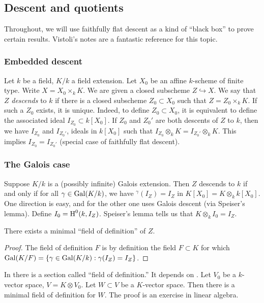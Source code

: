 \subsection{Descent and quotients}

Throughout, we will use faithfully flat descent as a kind of ``black box'' to 
prove certain results. Vistoli's notes \cite{v05} are a fantastic reference for 
this topic. 


\subsubsection{Embedded descent}

Let $k$ be a field, $K/k$ a field extension. Let $X_0$ be an affine $k$-scheme 
of finite type. Write $X=X_0\times_k K$. We are given a closed subscheme 
$Z\hookrightarrow X$. We say that $Z$ \emph{descends} to $k$ if there is a closed 
subscheme $Z_0\subset X_0$ such that $Z=Z_0\times_k K$. If such a $Z_0$ exists, 
it is unique. Indeed, to define $Z_0\subset X_0$, it is equivalent to 
define the associated ideal $I_{Z_0}\subset k[X_0]$. If $Z_0$ and $Z_0'$ are 
both descents of $Z$ to $k$, then we have $I_{Z_0}$ and $I_{Z_0'}$, ideals 
in $k[X_0]$ such that $I_{Z_0}\otimes_k K=I_{Z_0'}\otimes_k K$. This implies 
$I_{Z_0} = I_{Z_0'}$ (special case of faithfully flat descent). 


\subsubsection{The Galois case}

Suppose $K/k$ is a (possibly infinite) Galois extension. Then $Z$ descends to 
$k$ if and only if for all $\gamma\in \operatorname{Gal}(K/k)$, we have 
$^\gamma(I_Z) = I_Z$ in $K[X_0] = K\otimes_k k[X_0]$. One direction is easy, 
and for the other one uses Galois descent (via Speiser's lemma). Define 
$I_0=\operatorname{H}^0(k, I_Z)$. Speiser's lemma tells us that $K\otimes_k I_0 = I_Z$. 

\begin{coro}
There exists a minimal ``field of definition'' of $Z$.
\end{coro}
\begin{proof}
The field of definition $F$ is by definition the field $F\subset K$ for which 
$\operatorname{Gal}(K/F)=\{\gamma\in \operatorname{Gal}(K/k):\gamma(I_Z)=I_Z\}$. 
\end{proof}

In \cite[4.8]{ega4} there is a section called ``field of definition.'' It 
depends on \cite[II.8]{b03}. Let $V_0$ be a $k$-vector space, 
$V=K\otimes V_0$. Let $W\subset V$ be a $K$-vector space. Then there is a 
minimal field of definition for $W$. The proof is an exercise in linear 
algebra. 

